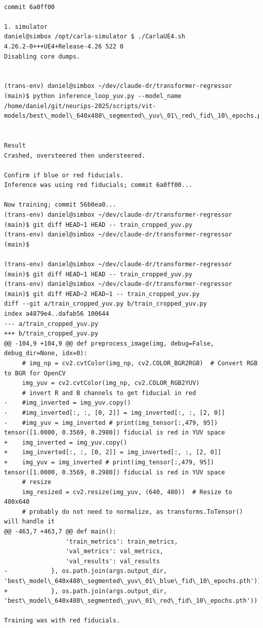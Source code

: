 \begin{verbatim}

commit 6a0ff00

1. simulator
daniel@simbox /opt/carla-simulator $ ./CarlaUE4.sh 
4.26.2-0+++UE4+Release-4.26 522 0
Disabling core dumps.


(trans-env) daniel@simbox ~/dev/claude-dr/transformer-regressor (main)$ python inference_loop_yuv.py --model_name 
/home/daniel/git/neurips-2025/scripts/vit-models/best\_model\_640x480\_segmented\_yuv\_01\_red\_fid\_10\_epochs.pth


Result
Crashed, oversteered then understeered.

Confirm if blue or red fiducials.
Inference was using red fiducials; commit 6a0ff00... 

Now training; commit 56b0ea0...
(trans-env) daniel@simbox ~/dev/claude-dr/transformer-regressor (main)$ git diff HEAD~1 HEAD -- train_cropped_yuv.py
(trans-env) daniel@simbox ~/dev/claude-dr/transformer-regressor (main)$ 

(trans-env) daniel@simbox ~/dev/claude-dr/transformer-regressor (main)$ git diff HEAD~1 HEAD -- train_cropped_yuv.py
(trans-env) daniel@simbox ~/dev/claude-dr/transformer-regressor (main)$ git diff HEAD~2 HEAD~1 -- train_cropped_yuv.py
diff --git a/train_cropped_yuv.py b/train_cropped_yuv.py
index a4879e4..dafab56 100644
--- a/train_cropped_yuv.py
+++ b/train_cropped_yuv.py
@@ -104,9 +104,9 @@ def preprocess_image(img, debug=False, debug_dir=None, idx=0):
     # img_np = cv2.cvtColor(img_np, cv2.COLOR_BGR2RGB)  # Convert RGB to BGR for OpenCV
     img_yuv = cv2.cvtColor(img_np, cv2.COLOR_RGB2YUV) 
     # invert R and B channels to get fiducial in red
-    #img_inverted = img_yuv.copy()
-    #img_inverted[:, :, [0, 2]] = img_inverted[:, :, [2, 0]]
-    #img_yuv = img_inverted # print(img_tensor[:,479, 95]) tensor([1.0000, 0.3569, 0.2980]) fiducial is red in YUV space
+    img_inverted = img_yuv.copy()
+    img_inverted[:, :, [0, 2]] = img_inverted[:, :, [2, 0]]
+    img_yuv = img_inverted # print(img_tensor[:,479, 95]) tensor([1.0000, 0.3569, 0.2980]) fiducial is red in YUV space
     # resize
     img_resized = cv2.resize(img_yuv, (640, 480))  # Resize to 480x640
     # probably do not need to normalize, as transforms.ToTensor() will handle it
@@ -463,7 +463,7 @@ def main():
                 'train_metrics': train_metrics,
                 'val_metrics': val_metrics,
                 'val_results': val_results
-            }, os.path.join(args.output_dir, 'best\_model\_640x480\_segmented\_yuv\_01\_blue\_fid\_10\_epochs.pth'))
+            }, os.path.join(args.output_dir, 'best\_model\_640x480\_segmented\_yuv\_01\_red\_fid\_10\_epochs.pth'))

Training was with red fiducials.

\end{verbatim}

